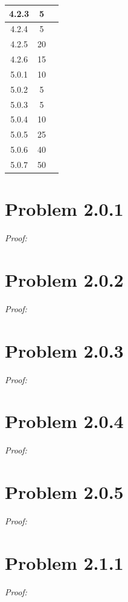 \documentclass[11pt]{article}
\theoremstyle{definition}
\theoremstyle{remark}
\theoremstyle{problem}
\begin{document}
\begin{center}
\begin{tabular}{|c|c|c|}
4.2.3 & 5 & \\\hline
4.2.4 & 5 & \\\hline
4.2.5 & 20 & \\\hline
4.2.6 & 15 & \\\hline
5.0.1 & 10 & \\\hline
5.0.2 & 5 & \\\hline
5.0.3 & 5 & \\\hline
5.0.4 & 10 & \\\hline
5.0.5 & 25 & \\\hline
5.0.6 & 40 & \\\hline
5.0.7 & 50 & \\\hline
\end{tabular}
\end{center}

\newpage
\tableofcontents
\newpage

\section{Problem 2.0.1}
\textit{Proof:} 
\newpage

\section{Problem 2.0.2}
\textit{Proof:} 
\newpage

\section{Problem 2.0.3}
\textit{Proof:} 
\newpage

\section{Problem 2.0.4}
\textit{Proof:} 
\newpage

\section{Problem 2.0.5}
\textit{Proof:} 
\newpage

\section{Problem 2.1.1}
\textit{Proof:} 
\newpage
\end{document}
